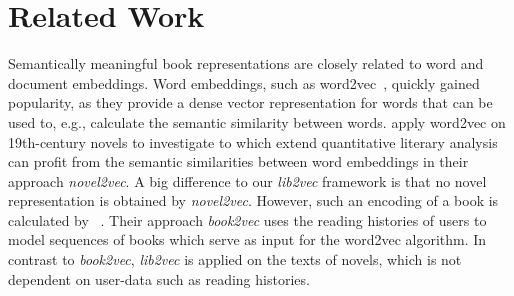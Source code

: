 \documentclass[11pt]{article}
\begin{document}
\section{Related Work}

Semantically meaningful book representations are closely related to word and document embeddings.
Word embeddings, such as word2vec~\citep{mikolov_efficient_2013}, quickly gained popularity, as they provide a dense vector representation for words that can be used to, e.g., calculate the semantic similarity between words.
\citet{grayson_novel2vec_2016} apply word2vec on 19th-century novels to investigate to which extend quantitative literary analysis can profit from the semantic similarities between word embeddings in their approach \emph{novel2vec}.
A big difference to our \emph{lib2vec} framework is that no novel representation is obtained by \emph{novel2vec}.
However, such an encoding of a book is calculated by ~\citet{anvari_book2vec_2018}.
Their approach \emph{book2vec} uses the reading histories of users to model sequences of books which serve as input for the word2vec algorithm. 
In contrast to \emph{book2vec}, \emph{lib2vec} is applied on the texts of novels, which is not dependent on user-data such as reading histories.
\end{document}
